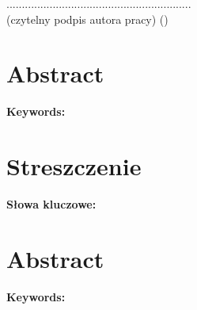 \documentclass[12pt,a4paper,twoside]{report}
\begin{document}
\vspace{1.5cm}
\begin{flushright}
    ............................................................\\
    \small(czytelny podpis autora pracy)
    \small (\ThesisAuthor)
\end{flushright}
\cleardoublepage

\thispagestyle{plain}
\chapter*{Abstract}
\AbstractEN

\vspace{1.0cm}
\noindent\textbf{Keywords:} \KeywordsEN
\cleardoublepage

\thispagestyle{plain}
\chapter*{Streszczenie}
\AbstractPL

\vspace{1cm}
\vspace{1.0cm}
\noindent\textbf{Słowa kluczowe:} \KeywordsPL
{}
\cleardoublepage

\thispagestyle{plain}
\chapter*{Abstract}
\AbstractEN

\vspace{1cm}
\noindent\textbf{Keywords:} \KeywordsEN
\cleardoublepage

\tableofcontents
\cleardoublepage

\listoffigures
{}
\cleardoublepage

\listoftables
{}
\cleardoublepage

\lstlistoflistings
{}
\cleardoublepage
\end{document}
